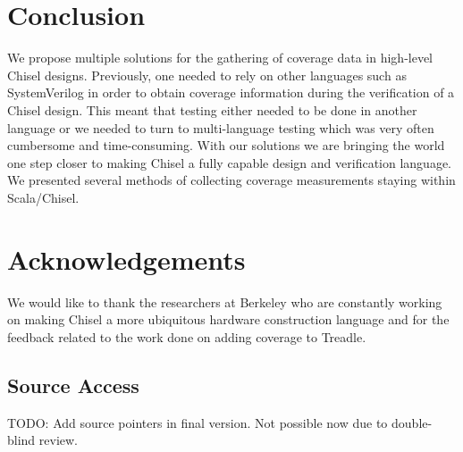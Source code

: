 \documentclass[conference]{IEEEtran}
\newcommand{\todo}[1]{{\color{olive} TODO: #1}}
\begin{document}
\section{Conclusion}
We propose multiple solutions for the gathering of coverage data in high-level Chisel designs. Previously, one needed to rely on other languages such as SystemVerilog in order to obtain coverage information during the verification of a Chisel design. This meant that testing either needed to be done in another language or we needed to turn to multi-language testing which was very often cumbersome and time-consuming. With our solutions we are bringing the world one step closer to making Chisel a fully capable design and verification language.
We presented several methods of collecting coverage measurements staying within Scala/Chisel.

\section*{Acknowledgements}
We would like to thank the researchers at Berkeley who are constantly working on making Chisel a more ubiquitous hardware construction language and for the feedback related to the work done on adding coverage to Treadle.

\subsection*{Source Access}

\todo{Add source pointers in final version. Not possible now due to double-blind review.}



\end{document}
